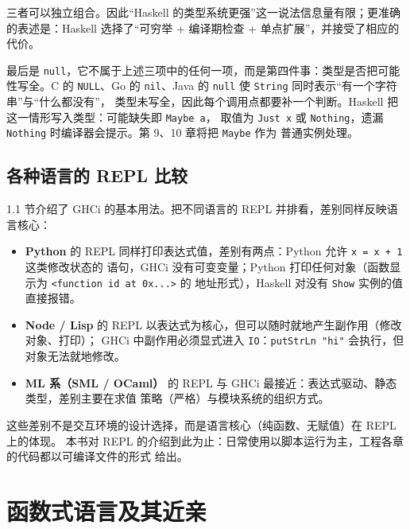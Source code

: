 三者可以独立组合。因此“Haskell 的类型系统更强”这一说法信息量有限；更准确的表述是：Haskell
选择了“可穷举 + 编译期检查 + 单点扩展”，并接受了相应的代价。

最后是 \passthrough{\lstinline!null!}，它不属于上述三项中的任何一项，而是第四件事：类型是否把可能性写全。C 的
\passthrough{\lstinline!NULL!}、Go 的 \passthrough{\lstinline!nil!}、Java 的 \passthrough{\lstinline!null!} 使 \passthrough{\lstinline!String!} 同时表示“有一个字符串”与“什么都没有”，
类型未写全，因此每个调用点都要补一个判断。Haskell 把这一情形写入类型：可能缺失即 \passthrough{\lstinline!Maybe a!}，
取值为 \passthrough{\lstinline!Just x!} 或 \passthrough{\lstinline!Nothing!}，遗漏 \passthrough{\lstinline!Nothing!} 时编译器会提示。第 9、10 章将把 \passthrough{\lstinline!Maybe!} 作为
普通实例处理。

\subsection{各种语言的 REPL 比较}\label{ux5404ux79cdux8bedux8a00ux7684-repl-ux6bd4ux8f83}

1.1 节介绍了 GHCi 的基本用法。把不同语言的 REPL 并排看，差别同样反映语言核心：

\begin{itemize}
\tightlist
\item
  \textbf{Python} 的 REPL 同样打印表达式值，差别有两点：Python 允许 \passthrough{\lstinline!x = x + 1!} 这类修改状态的
  语句，GHCi 没有可变变量；Python 打印任何对象（函数显示为 \passthrough{\lstinline!<function id at 0x...>!} 的
  地址形式），Haskell 对没有 \passthrough{\lstinline!Show!} 实例的值直接报错。
\item
  \textbf{Node / Lisp} 的 REPL 以表达式为核心，但可以随时就地产生副作用（修改对象、打印）；
  GHCi 中副作用必须显式进入 \passthrough{\lstinline!IO!}：\passthrough{\lstinline!putStrLn "hi"!} 会执行，但对象无法就地修改。
\item
  \textbf{ML 系（SML / OCaml）} 的 REPL 与 GHCi 最接近：表达式驱动、静态类型，差别主要在求值
  策略（严格）与模块系统的组织方式。
\end{itemize}

这些差别不是交互环境的设计选择，而是语言核心（纯函数、无赋值）在 REPL 上的体现。
本书对 REPL 的介绍到此为止：日常使用以脚本运行为主，工程各章的代码都以可编译文件的形式
给出。

\section{函数式语言及其近亲}\label{ux51fdux6570ux5f0fux8bedux8a00ux53caux5176ux8fd1ux4eb2}

